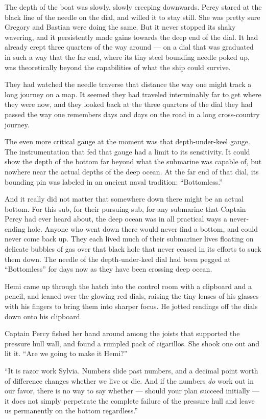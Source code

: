 \documentclass[]{article}
\begin{document}
\begin{multicols}{2}
The depth of the boat was slowly, slowly creeping downwards. Percy
stared at the black line of the needle on the dial, and willed it to
stay still. She was pretty sure Gregory and Bastian were doing the same.
But it never stopped its shaky wavering, and it persistently made gains
towards the deep end of the dial. It had already crept three quarters of
the way around --- on a dial that was graduated in such a way that the
far end, where its tiny steel bounding needle poked up, was
theoretically beyond the capabilities of what the ship could survive.

They had watched the needle traverse that distance the way one might
track a long journey on a map. It seemed they had traveled interminably
far to get where they were now, and they looked back at the three
quarters of the dial they had passed the way one remembers days and days
on the road in a long cross-country journey.

The even more critical gauge at the moment was that depth-under-keel
gauge. The instrumentation that fed that gauge had a limit to its
sensitivity. It could show the depth of the bottom far beyond what the
submarine was capable of, but nowhere near the actual depths of the deep
ocean. At the far end of that dial, its bounding pin was labeled in an
ancient naval tradition: ``Bottomless.''

And it really did not matter that somewhere down there might be an
actual bottom. For this sub, for their pursuing sub, for any submarine
that Captain Percy had ever heard about, the deep ocean was in all
practical ways a never-ending hole. Anyone who went down there would
never find a bottom, and could never come back up. They each lived much
of their submariner lives floating on delicate bubbles of gas over that
black hole that never ceased in its efforts to suck them down. The
needle of the depth-under-keel dial had been pegged at ``Bottomless''
for days now as they have been crossing deep ocean.

Hemi came up through the hatch into the control room with a clipboard
and a pencil, and leaned over the glowing red dials, raising the tiny
lenses of his glasses with his fingers to bring them into sharper focus.
He jotted readings off the dials down onto his clipboard.

Captain Percy fished her hand around among the joists that supported the
pressure hull wall, and found a rumpled pack of cigarillos. She shook
one out and lit it. ``Are we going to make it Hemi?''

``It is razor work Sylvia. Numbers slide past numbers, and a decimal
point worth of difference changes whether we live or die. And if the
numbers \emph{do} work out in our favor, there is no way to say whether
--- should your plan succeed initially --- it does not simply perpetrate
the complete failure of the pressure hull and leave us permanently on
the bottom regardless.''


\end{multicols}
\end{document}
